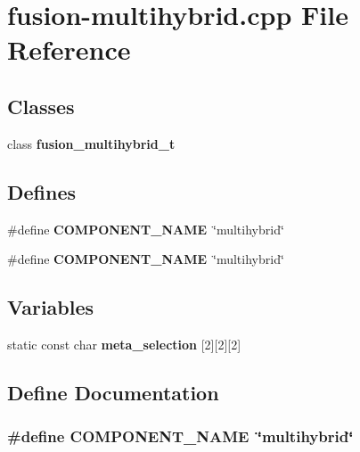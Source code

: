 \section{fusion-multihybrid.cpp File Reference}
\label{fusion-multihybrid_8cpp}
\subsection*{Classes}
\begin{CompactItemize}
\item 
class {\bf fusion\_\-multihybrid\_\-t}
\end{CompactItemize}
\subsection*{Defines}
\begin{CompactItemize}
\item 
\#define {\bf COMPONENT\_\-NAME}~\char`\"{}multihybrid\char`\"{}
\item 
\#define {\bf COMPONENT\_\-NAME}~\char`\"{}multihybrid\char`\"{}
\end{CompactItemize}
\subsection*{Variables}
\begin{CompactItemize}
\item 
static const char {\bf meta\_\-selection} [2][2][2]
\end{CompactItemize}


\subsection{Define Documentation}
\subsubsection[{COMPONENT\_\-NAME}]{\setlength{\rightskip}{0pt plus 5cm}\#define COMPONENT\_\-NAME~\char`\"{}multihybrid\char`\"{}}\label{zesto-bpred_8cpp_9146ade7ce24e3db226a973a59063892}


